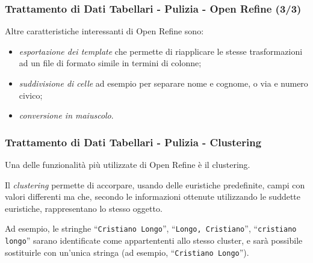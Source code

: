\documentclass[8pt]{beamer}
\begin{document}
\begin{frame}
 \frametitle{Trattamento di Dati Tabellari - Pulizia - Open Refine (3/3)}
 
 Altre caratteristiche interessanti di Open Refine sono:
 
 \begin{itemize}[<+->]
  \item \emph{esportazione dei template}  che permette di riapplicare le stesse trasformazioni ad un file
  di formato simile in termini di colonne;
  \item \emph{suddivisione di celle} ad esempio per separare nome e cognome, o via e numero civico;
  \item \emph{conversione in maiuscolo}.
 \end{itemize}
\end{frame}

\begin{frame}
 \frametitle{Trattamento di Dati Tabellari - Pulizia - Clustering}
 
 Una delle funzionalit\`a pi\`u utilizzate di Open Refine \`e il clustering.
 \vspace{\baselineskip}
 
 Il \emph{clustering} permette di accorpare, usando delle euristiche predefinite, 
 campi con valori differenti ma che, secondo le informazioni ottenute utilizzando
 le suddette euristiche, rappresentano lo stesso oggetto.
 \vspace{\baselineskip}
 
 Ad esempio, le stringhe ``\texttt{Cristiano Longo}'', ``\texttt{Longo, Cristiano}'',
 ``\texttt{cristiano longo}'' sarano identificate come appartententi allo stesso cluster,
 e sar\`a possibile sostituirle con un'unica stringa (ad esempio, ``\texttt{Cristiano Longo}''). 
\end{frame}
\end{document}
